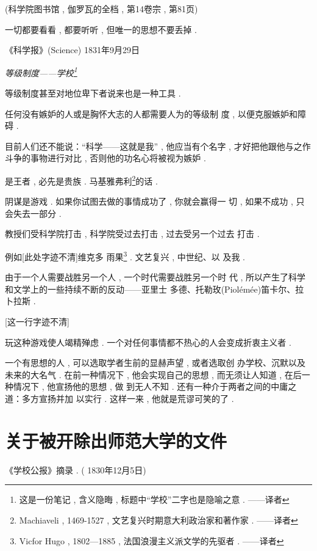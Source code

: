 \begin{center}
	(科学院图书馆 , 伽罗瓦的全档 , 第14卷宗 , 第81页)
\end{center}

\begin{flushright}
	一切都要看看 , 都要听听 , 但唯一的思想不要丢掉 . 

《科学报》(Science) 1831年9月29日
\end{flushright}

\begin{center}
	\emph{等级制度——学校\footnote{这是一份笔记 , 含义隐晦 , 标题中“学校”二字也是隐喻之意 . ——译者}}
\end{center}

等级制度甚至对地位卑下者说来也是一种工具 . 

任何没有嫉妒的人或是胸怀大志的人都需要人为的等级制 度 , 以便克服嫉妒和障碍 . 

目前人们还不能说：“科学——这就是我” , 他应当有个名字 ,  才好把他跟他与之作斗争的事物进行对比 , 否则他的功名心将被视为嫉妒 . 

是王者 , 必先是贵族 . 马基雅弗利\footnote{Machiaveli , 1469-1527 , 文艺复兴时期意大利政治家和著作家 . ——译者}的话 . 

阴谋是游戏 . 如果你试图去做的事情成功了 , 你就会赢得一 切 , 如果不成功 , 只会失去一部分 . 

教授们受科学院打击 , 科学院受过去打击 , 过去受另一个过去 打击 . 

例如[此处字迹不清]维克多 \textbullet 雨果\footnote{Vicfor Hugo ,  1802—1885 , 法国浪漫主义派文学的先驱者 . ——译者} . 文艺复兴 , 中世纪、以 及我 . 

由于一个人需要战胜另一个人 , 一个时代需要战胜另一个时 代 , 所以产生了科学和文学上的一些持续不断的反动——亚里士 多德、托勒玫(Piolémée)笛卡尔、拉卜拉斯 . 

[这一行字迹不清]

玩这种游戏使人竭精殚虑 . 一个对任何事情都不热心的人会变成折衷主义者 . 

一个有思想的人 , 可以选取学者生前的显赫声望 , 或者选取创 办学校、沉默以及未来的大名气 . 在前一种情况下 , 他会实现自己的思想 , 而无须让人知道 , 在后一种情况下 , 他宣扬他的思想 , 做 到无人不知 . 还有一种介于两者之间的中庸之道：多方宣扬并加 以实行 . 这样一来 , 他就是荒谬可笑的了 . 

\section{关于被开除出师范大学的文件}
\begin{center}
	《学校公报》摘录 . ( 1830年12月5日)
\end{center}

